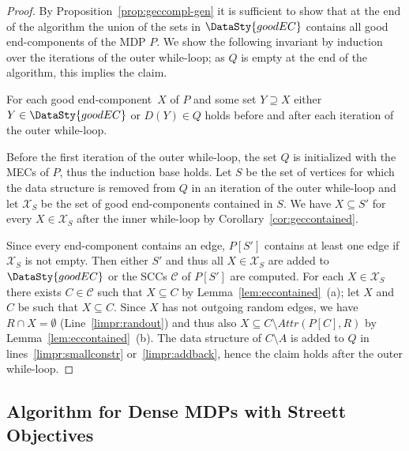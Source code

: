 \documentclass[11pt,letterpaper]{article}
\newcommand{\lu}{\textup{(}}
\newcommand{\ru}{\textup{)}\xspace}
\newcommand{\upbr}[1]{\lu #1\ru}
\newcommand{\at}{\mathit{Attr}}
\newcommand{\mdp}{P\xspace}
\newcommand{\ec}{X\xspace}
\newcommand{\scc}{C\xspace}
\newcommand{\good}{\DataSty{goodEC}}
\newcommand{\ds}{\mathit{D}\xspace}
\begin{document}
\begin{proof}
	By Proposition~\ref{prop:geccompl-gen} it is sufficient to show that at the end of 
	the algorithm the union of the sets in $\good$ contains
	all good end-components of the MDP $\mdp$. We show the following invariant 
	by induction over the iterations of the outer while-loop;
	as $Q$ is empty at the end of the algorithm, this implies the claim.
	\begin{invariant}\label{inv:geccontained}
		For each good end-component~$\ec$ of $\mdp$ and some set $Y \supseteq \ec$
		either $Y \in \good$ or $\ds(Y) \in Q$ holds before and after each iteration 
		of the outer while-loop.
	\end{invariant}

	Before the first iteration of the outer while-loop, the 
	set $Q$ is initialized with the MECs of $\mdp$, thus the induction base holds.
	Let $S$ be the set of vertices for which the data structure is 
	removed from $Q$ in an iteration of the outer while-loop and 
	let $\mathcal{\ec}_S$ be the set of good end-components 
	contained in $S$. We have $\ec \subseteq S'$ for every 
	$\ec \in \mathcal{\ec}_S$ after the inner while-loop by Corollary~\ref{cor:geccontained}.
	
	Since every end-component contains an edge, $\mdp[S']$ contains at least one
	edge if $\mathcal{\ec}_S$ is not empty. Then either $S'$ and thus all $\ec \in 
	\mathcal{\ec}_S$ are added to $\good$ or the SCCs $\mathcal{\scc}$ of $\mdp[S']$ 
	are computed. For each $\ec \in \mathcal{\ec}_S$ there exists $\scc \in 
	\mathcal{\scc}$ such that $\ec \subseteq \scc$ by Lemma~\ref{lem:eccontained}~\upbr{a}; 
	let $\ec$ and $\scc$ be such that $\ec \subseteq \scc$. Since $\ec$ has not 
	outgoing random edges, we have $R \cap \ec = \emptyset$ (Line~\ref{limpr:randout})
	and thus also $\ec \subseteq \scc \setminus \at(\mdp[\scc],R)$ by Lemma~\ref{lem:eccontained}~\upbr{b}. The data structure of $\scc \setminus A$
	is added to $Q$ in lines~\ref{limpr:smallconstr} or~\ref{limpr:addback},
	hence the claim holds after the outer while-loop.
\end{proof}

\subsection{Algorithm for Dense MDPs with Streett Objectives}\label{sec:streettdense}
\end{document}

